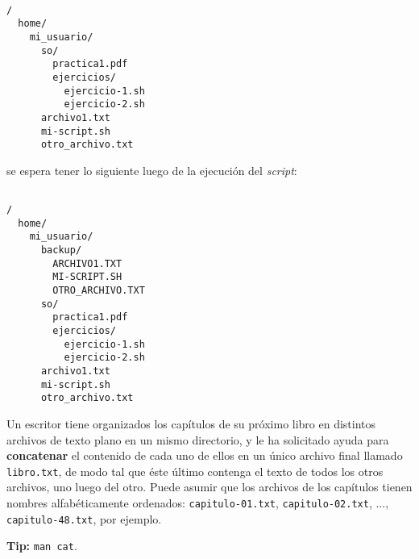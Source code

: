 \begin{questions}
  \begin{lstlisting}

/
  home/
    mi_usuario/
      so/
        practica1.pdf
        ejercicios/
          ejercicio-1.sh
          ejercicio-2.sh
      archivo1.txt
      mi-script.sh
      otro_archivo.txt

  \end{lstlisting}

se espera tener lo siguiente luego de la ejecución del \textit{script}:

\begin{lstlisting}

/
  home/
    mi_usuario/
      backup/
        ARCHIVO1.TXT
        MI-SCRIPT.SH
        OTRO_ARCHIVO.TXT
      so/
        practica1.pdf
        ejercicios/
          ejercicio-1.sh
          ejercicio-2.sh
      archivo1.txt
      mi-script.sh
      otro_archivo.txt

\end{lstlisting}

\question Un escritor tiene organizados los capítulos de su próximo libro en distintos archivos
  de texto plano en un mismo directorio, y le ha solicitado ayuda para \textbf{concatenar}
  el contenido de cada uno de ellos en un único archivo final llamado \texttt{libro.txt},
  de modo tal que éste último contenga el texto de todos los otros archivos, uno luego del otro.
  Puede asumir que los archivos de los capítulos tienen nombres alfabéticamente ordenados:
  \texttt{capitulo-01.txt}, \texttt{capitulo-02.txt}, ..., \texttt{capitulo-48.txt}, por ejemplo.

  \textbf{Tip:} \texttt{man cat}.

\end{questions}
